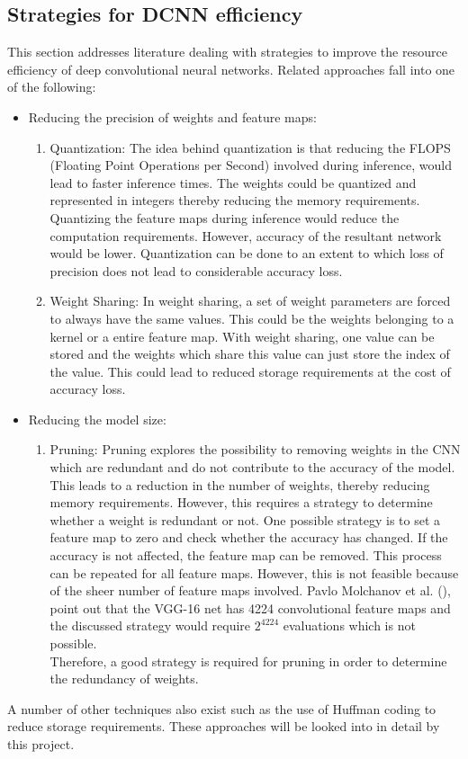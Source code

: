 \documentclass[a4paper,12pt]{article}
\begin{document}
\subsection{Strategies for DCNN efficiency}
This section addresses literature dealing with strategies to improve the resource efficiency of deep convolutional neural networks. Related approaches fall into one of the following:
\begin{itemize}
	\item Reducing the precision of weights and feature maps:\cite{8}
		\begin{enumerate}
			\item Quantization: The idea behind quantization is that reducing the FLOPS (Floating Point Operations per Second) involved during inference, would lead to faster inference times. The weights could be quantized and represented in integers thereby reducing the memory requirements. Quantizing the feature maps during inference would reduce the computation requirements. However, accuracy of the resultant network would be lower. Quantization can be done to an extent to which loss of precision does not lead to considerable accuracy loss.
			\item Weight Sharing: In weight sharing, a set of weight parameters are forced to always have the same values. This could be the weights belonging to a kernel or a entire feature map. With weight sharing, one value can be stored and the weights which share this value can just store the index of the value. This could lead to reduced storage requirements at the cost of accuracy loss.
		\end{enumerate}
	\item Reducing the model size:\cite{8}
		\begin{enumerate}
			\item Pruning: Pruning explores the possibility to removing  weights in the CNN which are redundant and do not contribute to the accuracy of the model. This leads to a reduction in the number of weights, thereby reducing memory requirements. However, this requires a strategy to determine whether a weight is redundant or not. One possible strategy is to set a feature map to zero and check whether the accuracy has changed. If the accuracy is not affected, the feature map can be removed. This process can be repeated for all feature maps. However, this is not feasible because of the sheer number of feature maps involved.  Pavlo Molchanov et al. (\cite{9}), point out that the VGG-16 net has 4224 convolutional feature maps and the discussed strategy would require $2^{4224}$ evaluations which is not possible.\\
			Therefore, a good strategy is required for pruning in order to determine the redundancy of weights.
		\end{enumerate}
\end{itemize}
A number of other techniques also exist such as the use of Huffman coding to reduce storage requirements\cite{10}. These approaches will be looked into in detail by this project.
\end{document}
